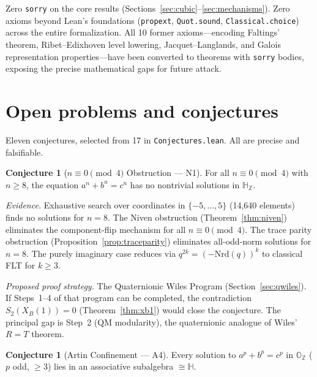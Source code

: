 \documentclass[11pt]{amsart}
\theoremstyle{plain}
\theoremstyle{definition}
\newtheorem{conjecture}[theorem]{Conjecture}
\theoremstyle{remark}
\newcommand{\Z}{\mathbb{Z}}
\newcommand{\HH}{\mathbb{H}}
\newcommand{\OO}{\mathbb{O}}
\begin{document}
Zero \texttt{sorry} on the core results (Sections~\ref{sec:cubic}--\ref{sec:mechanisms}).
Zero axioms beyond Lean's foundations
(\texttt{propext}, \texttt{Quot.sound}, \texttt{Classical.choice})
across the entire formalization.
All 10 former axioms---encoding Faltings' theorem, Ribet--Edixhoven level lowering,
Jacquet--Langlands, and Galois representation properties---have been
converted to theorems with \texttt{sorry} bodies, exposing the precise
mathematical gaps for future attack.


\section{Open problems and conjectures}\label{sec:open}

Eleven conjectures, selected from 17 in \texttt{Conjectures.lean}.
All are precise and falsifiable.

\begin{conjecture}[$n \equiv 0 \pmod{4}$ Obstruction --- N1]\label{conj:mod4}
For all $n \equiv 0 \pmod{4}$ with $n \geq 8$,
the equation $a^n + b^n = c^n$ has no nontrivial solutions in $\HH_\Z$.
\end{conjecture}

\noindent
\emph{Evidence.}
Exhaustive search over coordinates in $\{-5, \ldots, 5\}$ (14{,}640 elements) finds no solutions for $n = 8$.
The Niven obstruction (Theorem~\ref{thm:niven}) eliminates the component-flip mechanism for all $n \equiv 0 \pmod 4$.
The trace parity obstruction (Proposition~\ref{prop:traceparity}) eliminates all-odd-norm solutions for $n = 8$.
The purely imaginary case reduces via $q^{2k} = (-\mathrm{Nrd}(q))^k$ to classical FLT for $k \geq 3$.

\emph{Proposed proof strategy.}
The Quaternionic Wiles Program (Section~\ref{sec:qwiles}).
If Steps~1--4 of that program can be completed, the contradiction
$S_2(X_B(1)) = 0$ (Theorem~\ref{thm:xb1}) would close the conjecture.
The principal gap is Step~2 (QM modularity), the quaternionic analogue of Wiles' $R = T$ theorem.

\begin{conjecture}[Artin Confinement --- A4]\label{conj:artin}
Every solution to $a^p + b^p = c^p$ in $\OO_\Z$ ($p$ odd, $\geq 3$) lies
in an associative subalgebra $\cong \HH$.
\end{conjecture}
\end{document}
